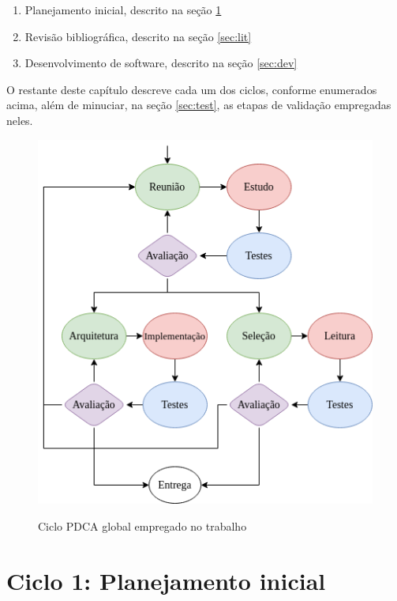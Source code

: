 \documentclass[cic,tc]{iiufrgs}
\begin{document}
\begin{enumerate}
    \item Planejamento inicial, descrito na seção \ref{sec:plan}
    \item Revisão bibliográfica, descrito na seção \ref{sec:lit}
    \item Desenvolvimento de software, descrito na seção \ref{sec:dev}
\end{enumerate}

O restante deste capítulo descreve cada um dos ciclos, conforme enumerados
acima, além de minuciar, na seção \ref{sec:test}, as etapas de validação
empregadas neles.

\begin{figure}[H] \caption{Ciclo PDCA global empregado no trabalho} \begin{center}
\includegraphics[width=0.75\linewidth]{img/pdca_global.png} \end{center}
 \label{fig:pdca_global} \end{figure}

\section{Ciclo 1: Planejamento inicial}
\label{sec:plan}
\end{document}
